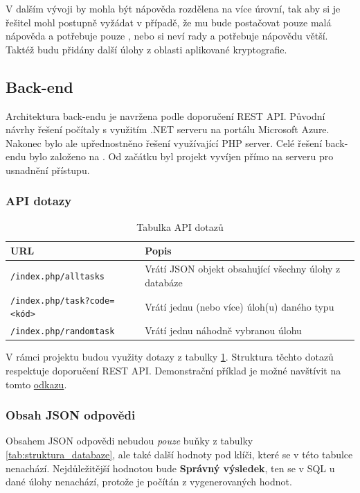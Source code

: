 \documentclass[titlepage]{article}
\begin{document}
V dalším vývoji by mohla být nápověda rozdělena na více úrovní, tak aby si je řešitel mohl postupně vyžádat v případě, že mu bude postačovat pouze malá nápověda a potřebuje pouze , nebo si neví rady a potřebuje nápovědu větší. Taktéž budu přidány další úlohy z oblasti aplikované kryptografie.   

\subsection{Back-end}
Architektura back-endu je navržena podle doporučení REST API. Původní návrhy řešení počítaly s využitím .NET serveru na portálu Microsoft Azure. Nakonec bylo ale upřednostněno řešení využívající PHP server. Celé řešení back-endu bylo založeno na \cite{restapi}. Od začátku byl projekt vyvíjen přímo na serveru pro usnadnění přístupu. 


\subsubsection{API dotazy}
\begin{table}[b]
    \centering
    \caption{Tabulka API dotazů}
    \label{tab:api_dotazy}
    \vspace{.5em}
    \begin{tabular}{|l | p{5cm} |}
        \hline
        \textbf{URL} & \textbf{Popis} \\
        \hline \hline
      \texttt{/index.php/alltasks} & Vrátí JSON objekt obsahující všechny úlohy z databáze \\
        \hline
        \texttt{/index.php/task?code=<kód>} & Vrátí jednu (nebo více) úloh(u) daného typu \\
        \hline
        \texttt{/index.php/randomtask} & Vrátí jednu náhodně vybranou úlohu \\
        \hline
    \end{tabular}
\end{table}

V rámci projektu budou využity dotazy z tabulky \ref{tab:api_dotazy}. Struktura těchto dotazů respektuje doporučení REST API. Demonstrační příklad je možné navštívit na tomto \href{http://vut-fekt-mpckry-gr14.8u.cz/index.php/alltasks}{odkazu}.

\subsubsection{Obsah JSON odpovědi}
Obsahem JSON odpovědi nebudou \emph{pouze} buňky z tabulky \ref{tab:struktura_databaze}, ale také další hodnoty pod klíči, které se v této tabulce nenachází. Nejdůležitější hodnotou bude \textbf{Správný výsledek}, ten se v SQL u dané úlohy nenachází, protože je počítán z vygenerovaných hodnot. 
\end{document}
